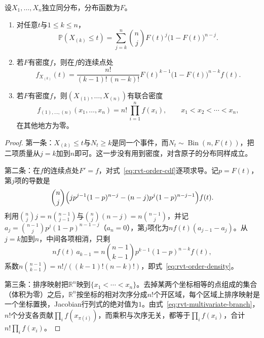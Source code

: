 \begin{theorem}[顺序统计量的分布]
\label{thm:rvt-order-statistics}
设$X_1,\ldots,X_n$独立同分布，分布函数为$F$。
\begin{enumerate}
 \item 对任意$t$与$1\leq k\leq n$，
 \begin{equation}
  \mathbb{P}(X_{(k)}\leq t)=\sum_{j=k}^{n}\binom{n}{j}F(t)^{j}\bigl(1-F(t)\bigr)^{n-j} .
  \label{eq:rvt-order-cdf}
 \end{equation}
 \item 若$F$有密度$f$，则在$f$的连续点处
 \begin{equation}
  f_{X_{(k)}}(t)=\frac{n!}{(k-1)!\,(n-k)!}F(t)^{k-1}\bigl(1-F(t)\bigr)^{n-k}f(t) .
  \label{eq:rvt-order-density}
 \end{equation}
 \item 若$F$有密度$f$，则$(X_{(1)},\ldots,X_{(n)})$有联合密度
 \begin{equation}
  f_{(1),\ldots,(n)}(x_1,\ldots,x_n)=n!\,\prod_{i=1}^{n}f(x_i),\qquad x_1<x_2<\cdots<x_n ,
  \label{eq:rvt-order-joint}
 \end{equation}
 在其他地方为零。
\end{enumerate}
\end{theorem}

\begin{proof}
第一条：$X_{(k)}\leq t$与$N_t\geq k$是同一个事件，而$N_t\sim\operatorname{Bin}(n,F(t))$，把二项质量从$j=k$加到$n$即可。这一步没有用到密度，对含原子的分布同样成立。

第二条：在$f$的连续点处$F'=f$，对式~\eqref{eq:rvt-order-cdf}逐项求导。记$p=F(t)$，第$j$项的导数是
\[
 \binom{n}{j}\Bigl(jp^{j-1}(1-p)^{n-j}-(n-j)p^{j}(1-p)^{n-j-1}\Bigr)f(t) .
\]
利用$\binom{n}{j}j=n\binom{n-1}{j-1}$与$\binom{n}{j}(n-j)=n\binom{n-1}{j}$，并记$a_j=\binom{n-1}{j}p^{j}(1-p)^{n-1-j}$（$a_n=0$），第$j$项化为$nf(t)(a_{j-1}-a_j)$。从$j=k$加到$n$，中间各项相消，只剩
\[
 nf(t)\,a_{k-1}=n\binom{n-1}{k-1}p^{k-1}(1-p)^{n-k}f(t) ,
\]
系数$n\binom{n-1}{k-1}=n!/((k-1)!(n-k)!)$，即式~\eqref{eq:rvt-order-density}。

第三条：排序映射把$\mathbb{R}^{n}$映到$\{x_1<\cdots<x_n\}$。去掉某两个坐标相等的点组成的集合（体积为零）之后，$\mathbb{R}^{n}$按坐标的相对次序分成$n!$个开区域，每个区域上排序映射是一个坐标置换，Jacobian行列式的绝对值为$1$。由式~\eqref{eq:rvt-multivariate-branch}，$n!$个分支各贡献$\prod_if(x_{\pi(i)})$，而乘积与次序无关，都等于$\prod_if(x_i)$，合计$n!\prod_if(x_i)$。
\end{proof}

